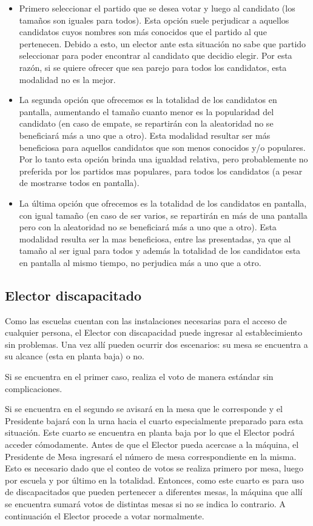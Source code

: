 \documentclass[spanish, 10pt,a4paper]{article}
\numberwithin{equation}{section} %
\begin{document}
\begin{itemize}

\item Primero seleccionar el partido que se desea votar y luego al candidato (los tamaños son iguales para todos). Esta opción suele perjudicar a aquellos candidatos cuyos nombres son más conocidos que el partido al que pertenecen. Debido a esto, un elector ante esta situación no sabe que partido seleccionar para poder encontrar al candidato que decidio elegir. Por esta razón, si se quiere ofrecer que sea parejo para todos los candidatos, esta modalidad no es la mejor.

\item La segunda opción que ofrecemos es la totalidad de los candidatos en pantalla, aumentando el tamaño cuanto menor es la popularidad del candidato (en caso de empate, se repartirán con la aleatoridad no se beneficiará más a uno que a otro). Esta modalidad resultar ser más beneficiosa para aquellos candidatos que son menos conocidos y/o populares. Por lo tanto esta opción  brinda una igualdad relativa, pero probablemente no preferida por los partidos mas populares, para todos los candidatos (a pesar de mostrarse todos en pantalla).

\item La última opción que ofrecemos es la totalidad de los candidatos en pantalla, con igual tamaño (en caso de ser varios, se repartirán en más de una pantalla pero con la aleatoridad no se beneficiará más a uno que a otro). Esta modalidad resulta ser la mas beneficiosa, entre las presentadas, ya que al tamaño al ser igual para todos y además la totalidad de los candidatos esta en pantalla al mismo tiempo, no perjudica más a uno que a otro.

\end{itemize}

\subsection{Elector discapacitado}
	Como las escuelas cuentan con las instalaciones necesarias para el acceso de cualquier persona, el Elector con discapacidad puede ingresar al establecimiento sin problemas. Una vez allí pueden ocurrir dos escenarios: su mesa se encuentra a su alcance (esta en planta baja) o no.
	
	Si se encuentra en el primer caso, realiza el voto de manera estándar sin complicaciones. 
	
	Si se encuentra en el segundo se avisará en la mesa que le corresponde y el Presidente bajará con la urna hacia el cuarto especialmente preparado para esta situación.	Este cuarto se encuentra en planta baja por lo que el Elector podrá acceder cómodamente. Antes de que el Elector pueda acercase a la máquina, el Presidente de Mesa ingresará el número de mesa correspondiente en la misma. Esto es necesario dado que el conteo de votos se realiza primero por mesa, luego por escuela y por último en la totalidad. Entonces, como este cuarto es para uso de discapacitados que pueden pertenecer a diferentes mesas, la máquina que allí se encuentra sumará votos de distintas mesas si no se indica lo contrario. A continuación el Elector procede a votar normalmente.
\end{document}
